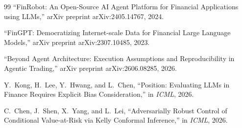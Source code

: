 \documentclass[twocolumn]{article}
\begin{document}
\begin{thebibliography}{99}
``FinRobot: An Open-Source AI Agent Platform for Financial Applications using LLMs,''
arXiv preprint arXiv:2405.14767, 2024.

``FinGPT: Democratizing Internet-scale Data for Financial Large Language Models,''
arXiv preprint arXiv:2307.10485, 2023.

``Beyond Agent Architecture: Execution Assumptions and Reproducibility in Agentic Trading,''
arXiv preprint arXiv:2606.08285, 2026.

Y.~Kong, H.~Lee, Y.~Hwang, and L.~Chen,
``Position: Evaluating LLMs in Finance Requires Explicit Bias Consideration,''
in \textit{ICML}, 2026.

C.~Chen, J.~Shen, X.~Yang, and L.~Lei,
``Adversarially Robust Control of Conditional Value-at-Risk via Kelly Conformal Inference,''
in \textit{ICML}, 2026.

\end{thebibliography}
\end{document}
